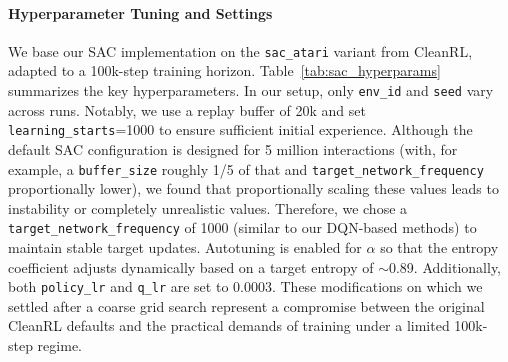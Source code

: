 \paragraph{Hyperparameter Tuning and Settings}
We base our SAC implementation on the \texttt{sac\_atari} variant from CleanRL, adapted to a 100k-step training horizon. Table~\ref{tab:sac_hyperparams} summarizes the key hyperparameters. In our setup, only \texttt{env\_id} and \texttt{seed} vary across runs. Notably, we use a replay buffer of 20k and set \texttt{learning\_starts}=1000 to ensure sufficient initial experience. Although the default SAC configuration is designed for 5 million interactions (with, for example, a \texttt{buffer\_size} roughly 1/5 of that and \verb*|target_network_frequency| proportionally lower), we found that proportionally scaling these values leads to instability or completely unrealistic values. Therefore, we chose a \verb*|target_network_frequency| of \num{1000} (similar to our DQN-based methods) to maintain stable target updates. Autotuning is enabled for $\alpha$ so that the entropy coefficient adjusts dynamically based on a target entropy of $\sim$\num{0.89}. Additionally, both \texttt{policy\_lr} and \texttt{q\_lr} are set to 0.0003. These modifications on which we settled after a coarse grid search represent a compromise between the original CleanRL defaults and the practical demands of training under a limited 100k-step regime.

